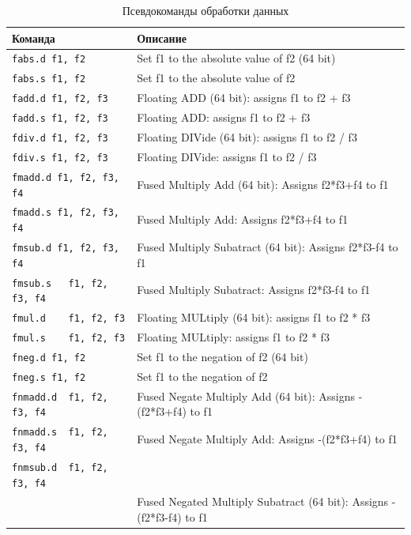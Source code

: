 \begin{table}[h]
    \caption{Псевдокоманды обработки данных}
    \centering
    \begin{tabularx}{\textwidth}{|l|X|}
        \hline
        \textbf{Команда} & \textbf{Описание} \\
        \hline \verb|fabs.d f1, f2| & Set f1 to the absolute value of f2 (64 bit) \\
        \hline \verb|fabs.s f1, f2| & Set f1 to the absolute value of f2 \\
        \hline \verb|fadd.d f1, f2, f3| & Floating ADD (64 bit): assigns f1 to f2 + f3 \\
        \hline \verb|fadd.s f1, f2, f3| & Floating ADD: assigns f1 to f2 + f3 \\
        \hline \verb|fdiv.d f1, f2, f3| & Floating DIVide (64 bit): assigns f1 to f2 / f3 \\
        \hline \verb|fdiv.s f1, f2, f3| & Floating DIVide: assigns f1 to f2 / f3 \\
        \hline \verb|fmadd.d f1, f2, f3, f4| & Fused Multiply Add (64 bit): Assigns f2*f3+f4 to f1 \\
        \hline \verb|fmadd.s f1, f2, f3, f4| & Fused Multiply Add: Assigns f2*f3+f4 to f1 \\
        \hline \verb|fmsub.d f1, f2, f3, f4| & Fused Multiply Subatract (64 bit): Assigns f2*f3-f4 to f1 \\
        \hline \verb|fmsub.s   f1, f2, f3, f4| & Fused Multiply Subatract: Assigns f2*f3-f4 to f1 \\
        \hline \verb|fmul.d    f1, f2, f3| & Floating MULtiply (64 bit): assigns f1 to f2 * f3 \\
        \hline \verb|fmul.s    f1, f2, f3| & Floating MULtiply: assigns f1 to f2 * f3 \\
        \hline \verb|fneg.d f1, f2| & Set f1 to the negation of f2 (64 bit) \\
        \hline \verb|fneg.s f1, f2| & Set f1 to the negation of f2 \\
        \hline \verb|fnmadd.d  f1, f2, f3, f4| & Fused Negate Multiply Add (64 bit): Assigns -(f2*f3+f4) to f1 \\
        \hline \verb|fnmadd.s  f1, f2, f3, f4| & Fused Negate Multiply Add: Assigns -(f2*f3+f4) to f1 \\
        \hline \verb|fnmsub.d  f1, f2, f3, f4| &  \\
        \hline \verb|| & Fused Negated Multiply Subatract (64 bit): Assigns -(f2*f3-f4) to f1 \\

\end{tabularx}
\end{table}
